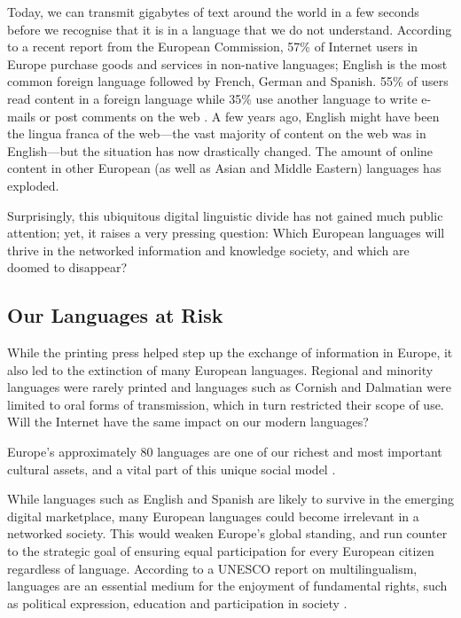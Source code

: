 \begin{multicols}{2}
Today, we can transmit gigabytes of text around the world in a few seconds before we recognise that it is in a language that we do not understand. According to a recent report from the European Commission, 57\% of Internet users in Europe purchase goods and services in non-native languages; English is the most common foreign language followed by French, German and Spanish. 55\% of users read content in a foreign language while 35\% use another language to write e-mails or post comments on the web \cite{EC1}. A few years ago, English might have been the lingua franca of the web—the vast majority of content on the web was in English—but the situation has now drastically changed. The amount of online content in other European (as well as Asian and Middle Eastern) languages has exploded.

Surprisingly, this ubiquitous digital linguistic divide has not gained much public attention; yet, it raises a very pressing question: Which European languages will thrive in the networked information and knowledge society, and which are doomed to disappear?

\subsection{Our Languages at Risk}

While the printing press helped step up the exchange of information in Europe, it also led to the extinction of many European languages. Regional and minority languages were rarely printed and languages such as Cornish and Dalmatian were limited to oral forms of transmission, which in turn restricted their scope of use. Will the Internet have the same impact on our modern languages?

Europe’s approximately 80 languages are one of our richest and most important cultural assets, and a vital part of this unique social model \cite{EC2}. 


While languages such as English and Spanish are likely to survive in the emerging digital marketplace, many European languages could become irrelevant in a networked society. This would weaken Europe’s global standing, and run counter to the strategic goal of ensuring equal participation for every European citizen regardless of language. According to a UNESCO report on multilingualism, languages are an essential medium for the enjoyment of fundamental rights, such as political expression, education and participation in society \cite{Unesco1}.


\end{multicols}
